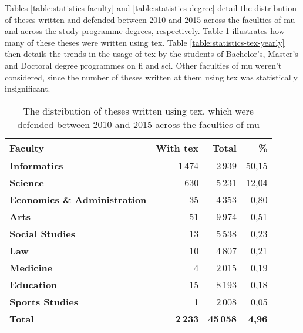   Tables \ref{table:statistics-faculty} and \ref{table:statistics-degree} detail the distribution of theses written and defended between 2010 and 2015 across the faculties of \gls{mu} and across the study programme degrees, respectively. Table \ref{table:statistics-tex} illustrates how many of these theses were written using \gls{tex}. Table \ref{table:statistics-tex-yearly} then details the trends in the usage of \gls{tex} by the students of Bachelor's, Master's and Doctoral degree programmes on \gls{fi} and \gls{sci}. Other faculties of \gls{mu} weren't considered, since the number of theses written at them using \gls{tex} was statistically insignificant.

  \begin{table}
    \begin{tabularx}{\textwidth}{Xrrr}
      \textbf{Faculty} & \textbf{With \gls{tex}} & \textbf{Total} & \textbf{\%} \\
      \hline
      \textbf{Informatics}                 & 1\,474 & 2\,939 & 50,15 \\%
      \textbf{Science}                     & 630    & 5\,231 & 12,04 \\%
      \textbf{Economics \& Administration} & 35     & 4\,353 &  0,80 \\%
      \textbf{Arts}                        & 51     & 9\,974 &  0,51 \\%
      \textbf{Social Studies}              & 13     & 5\,538 &  0,23 \\%
      \textbf{Law}                         & 10     & 4\,807 &  0,21 \\%
      \textbf{Medicine}                    & 4      & 2\,015 &  0,19 \\%
      \textbf{Education}                   & 15     & 8\,193 &  0,18 \\%
      \textbf{Sports Studies}              & 1      & 2\,008 &  0,05 \\%
      \hline
      \textbf{Total} & \textbf{2\,233} & \textbf{45\,058} & \textbf{4,96}
    \end{tabularx}
    \caption{The distribution of theses written using \gls{tex}, which were defended between 2010 and 2015 across the faculties of \gls{mu}}
    \label{table:statistics-tex}
  \end{table}
  
